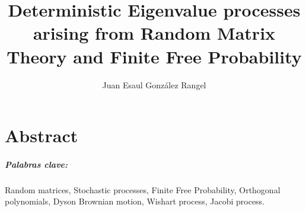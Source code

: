 \documentclass[letterpaper,11pt,twoside]{book}  %
\author{Juan Esaul González Rangel}
\title{Deterministic Eigenvalue processes arising from Random Matrix Theory and Finite Free Probability}
\begin{document}
\maketitle  %


\thispagestyle{empty}  %

\frontmatter

  
  
  




\chapter*{Abstract}




\paragraph{Palabras clave:} Random matrices, Stochastic processes, Finite Free Probability, Orthogonal polynomials, Dyson Brownian motion, Wishart process, Jacobi process.

\end{document}
